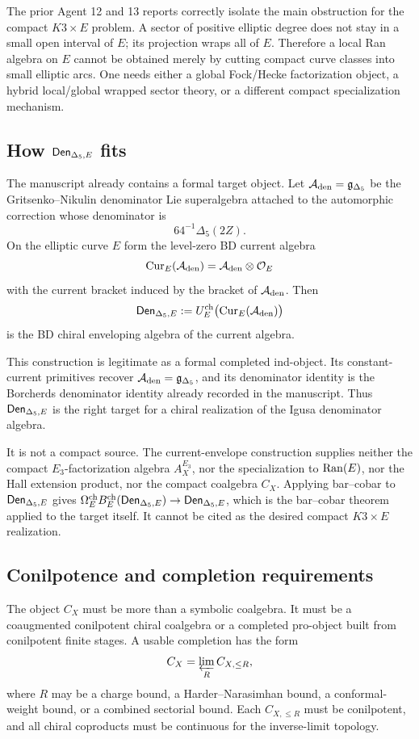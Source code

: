 The prior Agent 12 and 13 reports correctly isolate the main obstruction
for the compact \(K3\times E\) problem.  A sector of positive elliptic
degree does not stay in a small open interval of \(E\); its projection
wraps all of \(E\).  Therefore a local Ran algebra on \(E\) cannot be
obtained merely by cutting compact curve classes into small elliptic
arcs.  One needs either a global Fock/Hecke factorization object, a
hybrid local/global wrapped sector theory, or a different compact
specialization mechanism.

\subsection{How \(\mathsf{Den}_{\Delta_5,E}\) fits}

The manuscript already contains a formal target object.  Let
\(\mathcal A_{\mathrm{den}}=\mathfrak g_{\Delta_5}\) be the Gritsenko--Nikulin denominator Lie superalgebra
attached to the automorphic correction whose denominator is
\[
        64^{-1}\Delta_5(2Z).
\]
On the elliptic curve \(E\) form the level-zero BD current algebra
\[
        \operatorname{Cur}_E(\mathcal A_{\mathrm{den}})=\mathcal A_{\mathrm{den}}\otimes \mathcal O_E
\]
with the current bracket induced by the bracket of \(\mathcal A_{\mathrm{den}}\).  Then
\[
        \mathsf{Den}_{\Delta_5,E}
        :=
        U_E^{\mathrm{ch}}\bigl(\operatorname{Cur}_E(\mathcal A_{\mathrm{den}})\bigr)
\]
is the BD chiral enveloping algebra of the current algebra.

This construction is legitimate as a formal completed ind-object.  Its
constant-current primitives recover \(\mathcal A_{\mathrm{den}}=\mathfrak g_{\Delta_5}\), and its
denominator identity is the Borcherds denominator identity already
recorded in the manuscript.  Thus \(\mathsf{Den}_{\Delta_5,E}\) is the right target for a
chiral realization of the Igusa denominator algebra.

It is not a compact source.  The current-envelope construction supplies
neither the compact \(E_3\)-factorization algebra \(A_X^{E_3}\), nor the
specialization to \(\operatorname{Ran}(E)\), nor the Hall extension product, nor the
compact coalgebra \(C_X\).  Applying bar--cobar to \(\mathsf{Den}_{\Delta_5,E}\) gives
\(\Omega^{\mathrm{ch}}_EB^{\mathrm{ch}}_E(\mathsf{Den}_{\Delta_5,E})\to\mathsf{Den}_{\Delta_5,E}\), which is the bar--cobar theorem
applied to the target itself.  It cannot be cited as the desired
compact \(K3\times E\) realization.

\subsection{Conilpotence and completion requirements}

The object \(C_X\) must be more than a symbolic coalgebra.  It must be a
coaugmented conilpotent chiral coalgebra or a completed pro-object built
from conilpotent finite stages.  A usable completion has the form
\[
        C_X=\varprojlim_R C_{X,\leq R},
\]
where \(R\) may be a charge bound, a Harder--Narasimhan bound, a
conformal-weight bound, or a combined sectorial bound.  Each
\(C_{X,\leq R}\) must be conilpotent, and all chiral coproducts must be
continuous for the inverse-limit topology.

